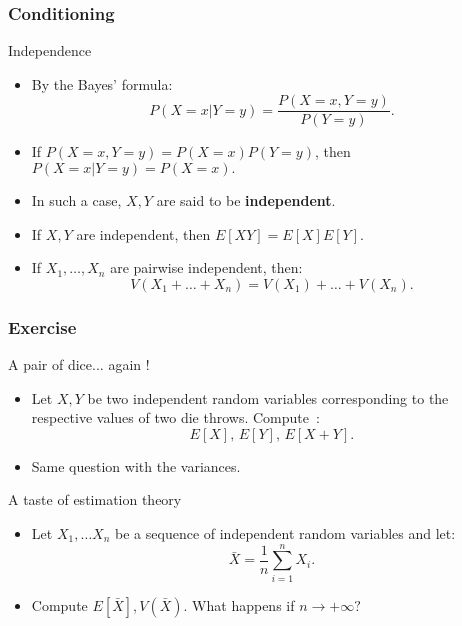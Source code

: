 \begin{frame}
    \frametitle{Conditioning}
\begin{block}{Independence}
    \begin{itemize}
        \item<+-> By the Bayes' formula:
        \begin{equation}
            P\left( X = x \vert Y = y \right) = \frac{P\left( X = x, Y = y \right)}{P(Y=y)}.
        \end{equation}
        \item<+-> If $P\left( X = x, Y = y \right) = P\left( X = x \right)P\left( Y = y \right)$, then
        $P\left( X = x \vert Y = y \right) = P\left( X = x \right).$
        \item<+-> In such a case, $X,Y$ are said to be \textbf{independent}.
        \item<+-> If $X,Y$ are independent, then $E\left[ XY \right] = E[X]E[Y].$
        \item<+-> If $X_1, \dots, X_n$ are pairwise independent, then:
        \begin{equation}
            V\left( X_1 + \dots + X_n \right) = V\left( X_1 \right) + \dots + V\left( X_n \right).
        \end{equation}
    \end{itemize}
\end{block}
\end{frame}
\begin{frame}
    \frametitle{Exercise}
    \begin{block}{A pair of dice... again !}
        \begin{itemize}
            \item<+-> Let $X,Y$ be two independent random variables corresponding
            to the respective values of two die throws. Compute~:
            \[
            E\left[ X \right], \, E\left[ Y \right], \, E\left[ X + Y \right].
            \]
            \item<+-> Same question with the variances.
        \end{itemize}
    \end{block}
    \begin{block}{A taste of estimation theory}
        \begin{itemize}
            \item<+-> Let $X_1, \dots X_n$ be a sequence of independent random variables and
            let:
            \[
            \bar{X} = \frac{1}{n} \sum_{i=1}^n X_i.
            \]
            \item<+-> Compute $E\left[ \bar{X} \right], V\left( \bar{X} \right).$ What happens 
            if $n \to +\infty ?$
        \end{itemize}
    \end{block}    
\end{frame}

